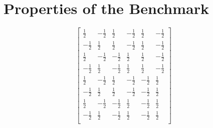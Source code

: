 \section{Properties of the Benchmark}

\begin{figure}[h]
\begin{center}
$$ 
\begin{bmatrix}
\frac{1}{2} & -\frac{1}{2} & \frac{1}{2} & -\frac{1}{2} & \frac{1}{2} & -\frac{1}{2}  \\
-\frac{1}{2} & \frac{1}{2} & \frac{1}{2} & -\frac{1}{2} & \frac{1}{2} & -\frac{1}{2} \\
\frac{1}{2} & -\frac{1}{2} & -\frac{1}{2} & \frac{1}{2} & \frac{1}{2} & -\frac{1}{2}  \\
-\frac{1}{2} & \frac{1}{2} & -\frac{1}{2} & \frac{1}{2} & \frac{1}{2} & -\frac{1}{2} \\
\frac{1}{2} & -\frac{1}{2} & \frac{1}{2} & -\frac{1}{2} & -\frac{1}{2} & \frac{1}{2}  \\
-\frac{1}{2} & \frac{1}{2} & \frac{1}{2} & -\frac{1}{2} & -\frac{1}{2} & \frac{1}{2}  \\
\frac{1}{2} & -\frac{1}{2} & -\frac{1}{2} & \frac{1}{2} &-\frac{1}{2} & \frac{1}{2} \\
-\frac{1}{2} & \frac{1}{2} & -\frac{1}{2} & \frac{1}{2}  & -\frac{1}{2} & \frac{1}{2} \\
\end{bmatrix} ~~~~~~~~
$$
\end{center}
\end{figure}
